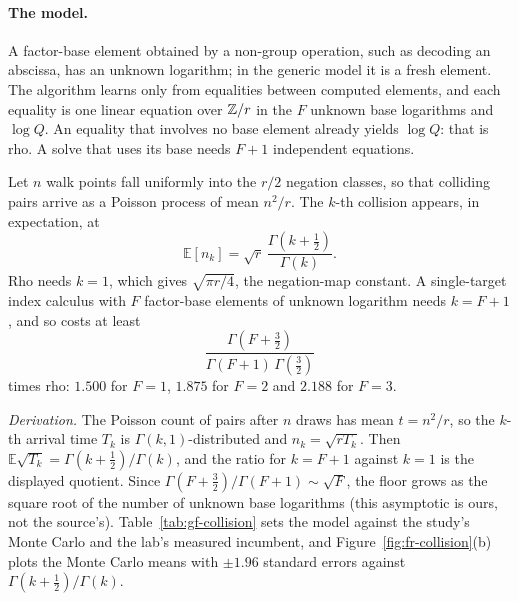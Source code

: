 \paragraph{The model.} A factor-base element obtained by a non-group
operation, such as decoding an abscissa, has an unknown logarithm; in the
generic model it is a fresh element. The algorithm learns only from
equalities between computed elements, and each equality is one linear
equation over $\mathbb{Z}/r$ in the $F$ unknown base logarithms and $\log Q$. An
equality that involves no base element already yields $\log Q$: that is
rho. A solve that uses its base needs $F+1$ independent equations.

\begin{proposition}\label{prop:collisionfloor}
Let $n$ walk points fall uniformly into the $r/2$ negation classes, so that
colliding pairs arrive as a Poisson process of mean $n^2/r$. The $k$-th
collision appears, in expectation, at
\[
  \mathbb{E}[n_k]=\sqrt r\,\frac{\Gamma(k+\tfrac12)}{\Gamma(k)} .
\]
Rho needs $k=1$, which gives $\sqrt{\pi r/4}$, the negation-map constant. A
single-target index calculus with $F$ factor-base elements of unknown
logarithm needs $k=F+1$, and so costs at least
\[
  \frac{\Gamma(F+\tfrac32)}{\Gamma(F+1)\,\Gamma(\tfrac32)}
\]
times rho: $1.500$ for $F=1$, $1.875$ for $F=2$ and $2.188$ for $F=3$.
\end{proposition}

\noindent\emph{Derivation.} The Poisson count of pairs after $n$ draws has
mean $t=n^2/r$, so the $k$-th arrival time $T_k$ is $\Gamma(k,1)$-distributed
and $n_k=\sqrt{rT_k}$. Then
$\mathbb{E}\sqrt{T_k}=\Gamma(k+\tfrac12)/\Gamma(k)$, and the ratio for
$k=F+1$ against $k=1$ is the displayed quotient. Since
$\Gamma(F+\tfrac32)/\Gamma(F+1)\sim\sqrt{F}$, the floor grows as the square
root of the number of unknown base logarithms (this asymptotic is ours,
not the source's). Table~\ref{tab:gf-collision} sets the model against the
study's Monte Carlo and the lab's measured incumbent, and
Figure~\ref{fig:fr-collision}(b) plots the Monte Carlo means with
$\pm1.96$ standard errors against $\Gamma(k+\tfrac12)/\Gamma(k)$.

